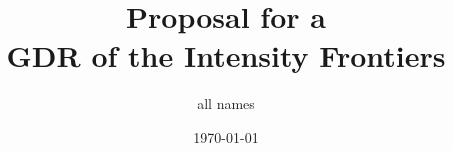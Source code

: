 \documentclass{article}
\title{Proposal for a \\ GDR of the Intensity Frontiers } %
\author{ all names } %
\date{\today} %
\begin{document}
\maketitle %

\begin{center}
\begin{tabular}{l r}
\end{tabular}
\end{center}
























\end{document}
